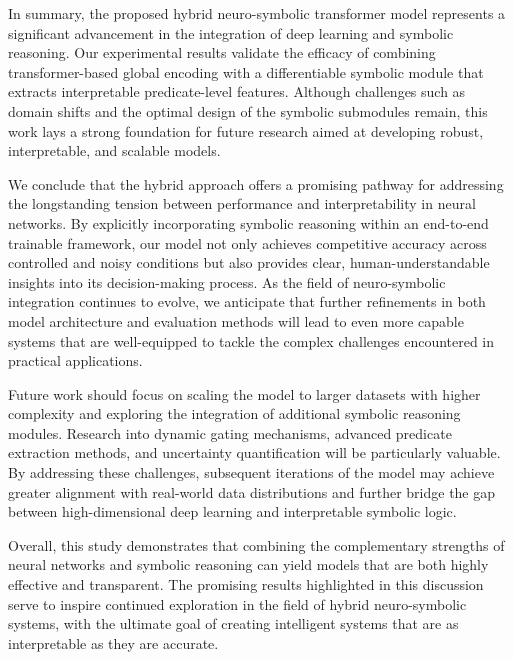 \documentclass{article}
\begin{document}
In summary, the proposed hybrid neuro-symbolic transformer model represents a significant advancement in the integration of deep learning and symbolic reasoning. Our experimental results validate the efficacy of combining transformer-based global encoding with a differentiable symbolic module that extracts interpretable predicate-level features. Although challenges such as domain shifts and the optimal design of the symbolic submodules remain, this work lays a strong foundation for future research aimed at developing robust, interpretable, and scalable models.

We conclude that the hybrid approach offers a promising pathway for addressing the longstanding tension between performance and interpretability in neural networks. By explicitly incorporating symbolic reasoning within an end-to-end trainable framework, our model not only achieves competitive accuracy across controlled and noisy conditions but also provides clear, human-understandable insights into its decision-making process. As the field of neuro-symbolic integration continues to evolve, we anticipate that further refinements in both model architecture and evaluation methods will lead to even more capable systems that are well-equipped to tackle the complex challenges encountered in practical applications.

Future work should focus on scaling the model to larger datasets with higher complexity and exploring the integration of additional symbolic reasoning modules. Research into dynamic gating mechanisms, advanced predicate extraction methods, and uncertainty quantification will be particularly valuable. By addressing these challenges, subsequent iterations of the model may achieve greater alignment with real-world data distributions and further bridge the gap between high-dimensional deep learning and interpretable symbolic logic.

Overall, this study demonstrates that combining the complementary strengths of neural networks and symbolic reasoning can yield models that are both highly effective and transparent. The promising results highlighted in this discussion serve to inspire continued exploration in the field of hybrid neuro-symbolic systems, with the ultimate goal of creating intelligent systems that are as interpretable as they are accurate.
\end{document}
